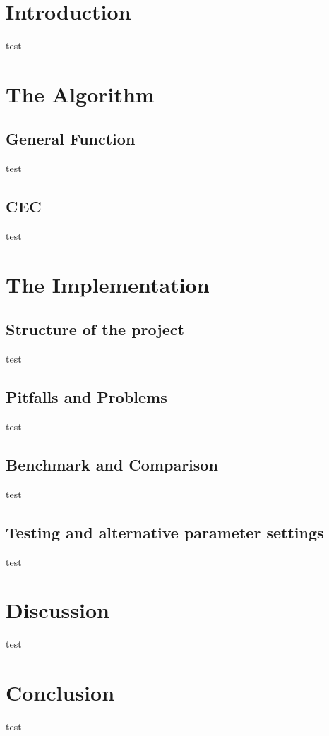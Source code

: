 \part{Introduction}
\label{introduction}

test

\pagebreak 

\part{The Algorithm}
\label{thealgorithm}

\chapter{General Function}
\label{generalfunction}

test

\chapter{CEC}
\label{cec}

test

\pagebreak 

\part{The Implementation}
\label{theimplementation}

\chapter{Structure of the project}
\label{structureoftheproject}

test

\chapter{Pitfalls and Problems}
\label{pitfallsandproblems}

test

\chapter{Benchmark and Comparison}
\label{benchmarkandcomparison}

test

\chapter{Testing and alternative parameter settings}
\label{testingandalternativeparametersettings}

test

\part{Discussion}
\label{discussion}

test

\part{Conclusion}
\label{conclusion}

test
